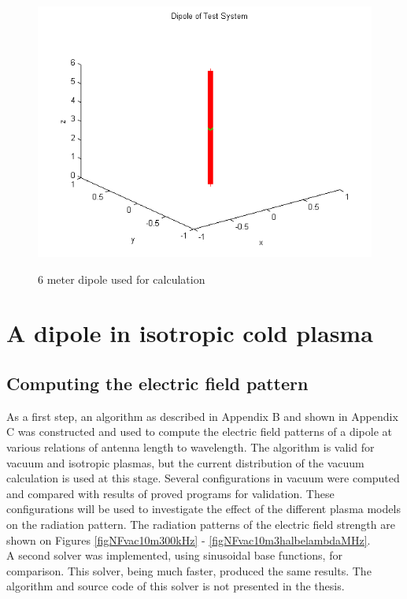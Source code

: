\documentclass[a4paper,11pt]{thesis}
\begin{document}
\begin{figure}
  \includegraphics[width=12cm]{DissPics/dipol}\\
  \caption{6 meter dipole used for calculation}\label{figDipol}
\end{figure}

\section{A dipole in isotropic cold plasma}
\subsection{Computing the electric field pattern}
As a first step, an algorithm as described in Appendix B and shown in Appendix C was constructed and used to compute the electric field patterns of a dipole at various relations of antenna length to wavelength. The algorithm is valid for vacuum and isotropic plasmas, but the current distribution of the vacuum calculation is used at this stage. Several configurations in vacuum were computed and compared with results of proved programs for validation. These configurations will be used to investigate the effect of the different plasma models on the radiation pattern. The radiation patterns of the electric field strength are shown on Figures \ref{figNFvac10m300kHz} - \ref{figNFvac10m3halbelambdaMHz}. \\

A second solver was implemented, using sinusoidal base functions, for comparison. This solver, being much faster, produced the same results. The algorithm and source code of this solver is not presented in the thesis.\\
\end{document}
